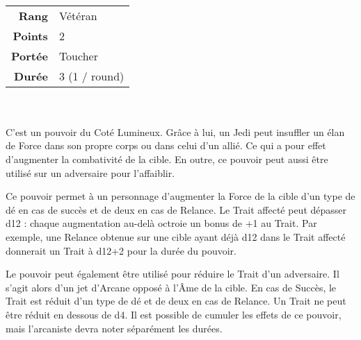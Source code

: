 \begin{description}[align=left] 

    \item [Chaleur de Force] ~ \\

        \begin{tabular}{ r l }
            \textbf{Rang}    & Vétéran \\
            \textbf{Points}  & 2 \\
            \textbf{Portée}  & Toucher \\
            \textbf{Durée}   & 3 (1 / round) \\
        \end{tabular}
        \\ \\
        C’est un pouvoir du Coté Lumineux. Grâce à lui, un Jedi peut insuffler un élan de Force dans son propre corps ou dans celui d’un allié. Ce qui a pour effet d’augmenter la combativité de la cible. En outre, ce pouvoir peut aussi être utilisé sur un adversaire pour l’affaiblir.

        Ce pouvoir permet à un personnage d’augmenter la Force de la cible d’un type de dé en cas de succès et de deux en cas de Relance. Le Trait affecté peut dépasser d12 : chaque augmentation au-delà octroie un bonus de +1 au Trait. Par exemple, une Relance obtenue sur une cible ayant déjà d12 dans le Trait affecté donnerait un Trait à d12+2 pour la durée du pouvoir. 

        Le pouvoir peut également être utilisé pour réduire le Trait d’un adversaire. Il s’agit alors d’un jet d’Arcane opposé à l’Âme de la cible. En cas de Succès, le Trait est réduit d’un type de dé et de deux en cas de Relance. Un Trait ne peut être réduit en dessous de d4. Il est possible de cumuler les effets de ce pouvoir, mais l’arcaniste devra noter séparément les durées.
        \\

    \item [Guérison de Force] ~ \\


\end{description}
